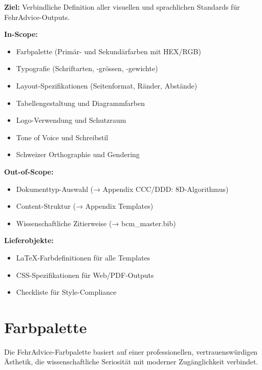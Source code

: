 \begin{tcolorbox}[colback=gray!5!white, colframe=gray!75!black, title=Appendix Scope]
\textbf{Ziel:} Verbindliche Definition aller visuellen und sprachlichen Standards für FehrAdvice-Outputs.

\textbf{In-Scope:}
\begin{itemize}
    \item Farbpalette (Primär- und Sekundärfarben mit HEX/RGB)
    \item Typografie (Schriftarten, -grössen, -gewichte)
    \item Layout-Spezifikationen (Seitenformat, Ränder, Abstände)
    \item Tabellengestaltung und Diagrammfarben
    \item Logo-Verwendung und Schutzraum
    \item Tone of Voice und Schreibstil
    \item Schweizer Orthographie und Gendering
\end{itemize}

\textbf{Out-of-Scope:}
\begin{itemize}
    \item Dokumenttyp-Auswahl (→ Appendix CCC/DDD: 8D-Algorithmus)
    \item Content-Struktur (→ Appendix Templates)
    \item Wissenschaftliche Zitierweise (→ bcm\_master.bib)
\end{itemize}

\textbf{Lieferobjekte:}
\begin{itemize}
    \item LaTeX-Farbdefinitionen für alle Templates
    \item CSS-Spezifikationen für Web/PDF-Outputs
    \item Checkliste für Style-Compliance
\end{itemize}
\end{tcolorbox}



\section{Farbpalette}
\label{sec:sg-colors}

Die FehrAdvice-Farbpalette basiert auf einer professionellen, vertrauenswürdigen
Ästhetik, die wissenschaftliche Seriosität mit moderner Zugänglichkeit verbindet.

